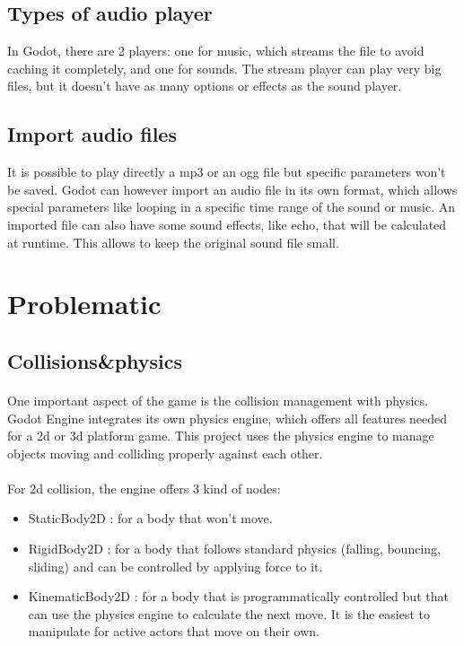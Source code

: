 \documentclass[10pt,a4paper]{article}
\begin{document}
\subsection{Types of audio player}
In Godot, there are 2 players: one for music, which streams the file to avoid caching it completely, and one for sounds. The stream player can play very big files, but it doesn't have as many options or effects as the sound player.
\subsection{Import audio files}
It is possible to play directly a mp3 or an ogg file but specific parameters won't be saved. Godot can however import an audio file in its own format, which allows special parameters like looping in a specific time range of the sound or music. An imported file can also have some sound effects, like echo, that will be calculated at runtime. This allows to keep the original sound file small.
\section{Problematic}

\subsection{Collisions\&physics}
\paragraph{}
One important aspect of the game is the collision management with physics.
Godot Engine integrates its own physics engine, which offers all features needed for a 2d or 3d platform game. This project uses the physics engine to manage objects moving and colliding properly against each other.

\paragraph{}
For 2d collision, the engine offers 3 kind of nodes:
\begin{itemize}
  \item StaticBody2D    : for a body that won't move.
  \item RigidBody2D     : for a body that follows standard physics (falling, bouncing, sliding) and can be controlled by applying force to it.
  \item KinematicBody2D : for a body that is programmatically controlled but that can use the physics engine to calculate the next move. It is the easiest to manipulate for active actors that move on their own.
\end{itemize}
\end{document}
